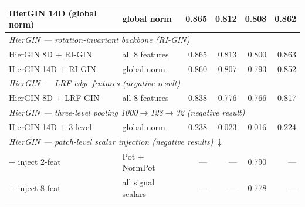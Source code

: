 \begin{table}[ht]
\begin{tabular}{llrrrr}
    \quad HierGIN 14D (global norm)   & global norm          & 0.865 & 0.812 & 0.808 & 0.862 \\
    \midrule
    \multicolumn{6}{l}{\textit{HierGIN --- rotation-invariant backbone (RI-GIN)}} \\
    \quad HierGIN 8D + RI-GIN         & all 8 features       & 0.865 & 0.813 & 0.800 & 0.863 \\
    \quad HierGIN 14D + RI-GIN         & global norm      & 0.860 & 0.807 & 0.793 & 0.852 \\
    \midrule
    \multicolumn{6}{l}{\textit{HierGIN --- LRF edge features (negative result)}} \\
    \quad HierGIN 8D + LRF-GIN        & all 8 features       & 0.838 & 0.776 & 0.766 & 0.817 \\
    \midrule
    \multicolumn{6}{l}{\textit{HierGIN --- three-level pooling 1000$\to$128$\to$32 (negative result)}} \\
    \quad HierGIN 14D + 3-level       & global norm          & 0.238 & 0.023 & 0.016 & 0.224 \\
    \midrule
    \multicolumn{6}{l}{\textit{HierGIN --- patch-level scalar injection (negative results)$\;\ddagger$}} \\
    \quad + inject 2-feat             & Pot + NormPot        & ---   & ---   & 0.790 & ---   \\
    \quad + inject 8-feat             & all signal scalars   & ---   & ---   & 0.778 & ---   \\
    \bottomrule
  \end{tabular}
\end{table}

